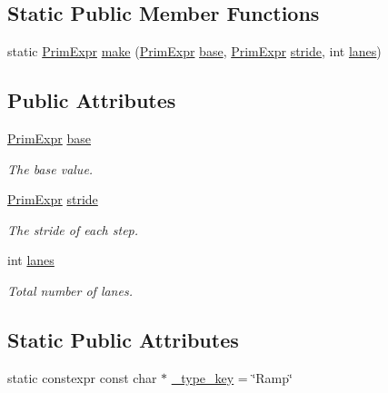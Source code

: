 \subsection*{Static Public Member Functions}
\begin{DoxyCompactItemize}
\item 
static \hyperlink{classtvm_1_1PrimExpr}{Prim\+Expr} \hyperlink{classtvm_1_1tir_1_1RampNode_a9a33a9a1ffcb236d86498b10eec315a9}{make} (\hyperlink{classtvm_1_1PrimExpr}{Prim\+Expr} \hyperlink{classtvm_1_1tir_1_1RampNode_aed87b929f940da5ded10afaa7a3a810c}{base}, \hyperlink{classtvm_1_1PrimExpr}{Prim\+Expr} \hyperlink{classtvm_1_1tir_1_1RampNode_a618c78e39d18f999dbdd3fe01436f447}{stride}, int \hyperlink{classtvm_1_1tir_1_1RampNode_a3fcfb520220b2fe522f9734f067ed979}{lanes})
\end{DoxyCompactItemize}
\subsection*{Public Attributes}
\begin{DoxyCompactItemize}
\item 
\hyperlink{classtvm_1_1PrimExpr}{Prim\+Expr} \hyperlink{classtvm_1_1tir_1_1RampNode_aed87b929f940da5ded10afaa7a3a810c}{base}
\begin{DoxyCompactList}\small\item\em The base value. \end{DoxyCompactList}\item 
\hyperlink{classtvm_1_1PrimExpr}{Prim\+Expr} \hyperlink{classtvm_1_1tir_1_1RampNode_a618c78e39d18f999dbdd3fe01436f447}{stride}
\begin{DoxyCompactList}\small\item\em The stride of each step. \end{DoxyCompactList}\item 
int \hyperlink{classtvm_1_1tir_1_1RampNode_a3fcfb520220b2fe522f9734f067ed979}{lanes}
\begin{DoxyCompactList}\small\item\em Total number of lanes. \end{DoxyCompactList}\end{DoxyCompactItemize}
\subsection*{Static Public Attributes}
\begin{DoxyCompactItemize}
\item 
static constexpr const char $\ast$ \hyperlink{classtvm_1_1tir_1_1RampNode_a49dfe84b8062280c2a498e9fbf6701f5}{\+\_\+type\+\_\+key} = \char`\"{}Ramp\char`\"{}
\end{DoxyCompactItemize}


